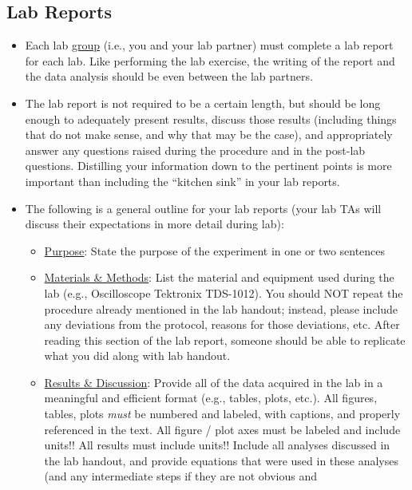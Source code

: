 \subsection{Lab Reports}
\begin{itemize}
    \item Each lab \underline{group} (i.e., you and your lab partner) must
        complete a lab report for each lab.  Like performing the lab exercise,
        the writing of the report and the data analysis should be even between
        the lab partners.
    \item The lab report is not required to be a certain length, but should be
        long enough to adequately present results, discuss those results
        (including things that do not make sense, and why that may be the
        case), and appropriately answer any questions raised during the
        procedure and in the post-lab questions.  Distilling your information
        down to the pertinent points is more important than including the
        ``kitchen sink'' in your lab reports.
    \item The following is a general outline for your lab reports (your lab TAs
        will discuss their expectations in more detail during lab):
    \begin{itemize}
        \item \underline{Purpose}: State the purpose of the experiment in one
            or two sentences
        \item \underline{Materials \& Methods}: List the material and equipment
            used during the lab (e.g., Oscilloscope Tektronix TDS-1012).  You
           should NOT repeat the procedure already mentioned in the lab
            handout; instead, please include any deviations from the protocol,
            reasons for those deviations, etc.  After reading this section of
            the lab report, someone should be able to replicate what you did
            along with lab handout.
        \item \underline{Results \& Discussion}: Provide all of the data
            acquired in the lab in a meaningful and efficient format (e.g.,
            tables, plots, etc.).  All figures, tables, plots \emph{must} be
            numbered and labeled, with captions, and properly referenced in the
            text.  All figure / plot axes must be labeled and include units!!
            All results must include units!! Include all analyses discussed in
            the lab handout, and provide equations that were used in these
            analyses (and any intermediate steps if they are not obvious and

\end{itemize}
\end{itemize}
